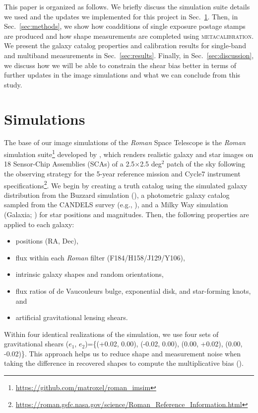 \documentclass[fleqn,usenatbib]{mnras}
\begin{document}
This paper is organized as follows. We briefly discuss the simulation suite details we used and the updates we implemented for this project in Sec.~\ref{sec:sims}. Then, in Sec.~\ref{sec:methods}, we show how coadditions of single exposure postage stamps are produced and how shape measurements are completed using \textsc{metacalibration}. We present the galaxy catalog properties and calibration results for single-band and multiband measurements in Sec.~\ref{sec:results}. Finally, in Sec.~\ref{sec:discussion}, we discuss how we will be able to constrain the shear bias better in terms of further updates in the image simulations and what we can conclude from this study. 


\section{Simulations}
\label{sec:sims}
The base of our image simulations of the \emph{Roman} Space Telescope is the \emph{Roman} simulation suite\footnote{\url{ https://github.com/matroxel/roman_imsim}} developed by \citet{2021MNRAS.501.2044T}, which renders realistic galaxy and star images on 18 Sensor-Chip Assemblies (SCAs) of a 2.5$\times$2.5 deg$^{2}$ patch of the sky following the observing strategy for the 5-year reference mission and Cycle7 instrument specifications\footnote{\url{https://roman.gsfc.nasa.gov/science/Roman_Reference_Information.html}}. We begin by creating a truth catalog using the simulated galaxy distribution from the Buzzard simulation (\citealt{2019arXiv190102401D}), a photometric galaxy catalog sampled from the CANDELS survey (e.g., \citealt{2019ApJ...877..117H}), and a Milky Way simulation (Galaxia; \citealt{2011ApJ...730....3S}) for star positions and magnitudes. Then, the following properties are applied to each galaxy:
\begin{itemize}
    \item positions (RA, Dec),
    \item flux within each \emph{Roman} filter (F184/H158/J129/Y106),
    \item intrinsic galaxy shapes and random orientations,
    \item flux ratios of de Vaucouleurs bulge, exponential disk, and star-forming knots, and
    \item artificial gravitational lensing shears.
\end{itemize} 
Within four identical realizations of the simulation, we use four sets of gravitational shears ($e_{1}$, $e_{2}$)=\{(+0.02, 0.00), (-0.02, 0.00), (0.00, +0.02), (0.00, -0.02)\}. This approach helps us to reduce shape and measurement noise when taking the difference in recovered shapes to compute the multiplicative bias (\citealt{2019A&A...621A...2P}). 
\end{document}
